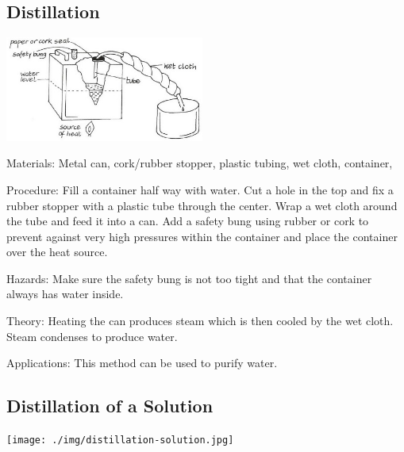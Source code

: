 \begin{multicols}{2}
\subsection{Distillation}

\begin{center}
\includegraphics[width=0.49\textwidth]{./img/vso/distillation.jpg}
\end{center}

\begin{description*}
\item[Materials:]{Metal can, cork/rubber stopper, plastic tubing, wet cloth, container, }
\item[Procedure:]{Fill a container half way with water. Cut a hole in the top and fix a rubber stopper with a plastic tube through the center. Wrap a wet cloth around the tube and feed it into a can. Add a safety bung using rubber or cork to prevent against very high pressures within the container and place the container over the heat source.}
\item[Hazards:]{Make sure the safety bung is not too tight and that the container always has water inside.}
\item[Theory:]{Heating the can produces steam which is then cooled by the wet cloth. Steam condenses to produce water.}
\item[Applications:]{This method can be used to purify water.}
\end{description*}

\subsection{Distillation of a Solution}

\begin{center}
\texttt{[image: ./img/distillation-solution.jpg]}
\end{center}


\end{multicols}

